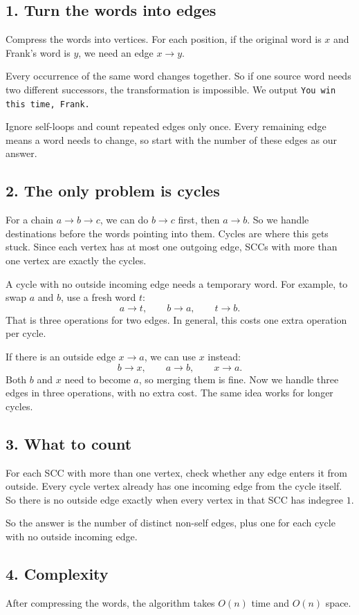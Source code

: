 \documentclass[11pt,a4paper]{article}
\begin{document}

\subsection*{1. Turn the words into edges}

Compress the words into vertices. For each position, if the original
word is $x$ and Frank's word is $y$, we need an edge $x\to y$.

Every occurrence of the same word changes together. So if one source
word needs two different successors, the transformation is impossible.
We output \texttt{You win this time, Frank.}

Ignore self-loops and count repeated edges only once. Every remaining
edge means a word needs to change, so start with the number of these
edges as our answer.

\subsection*{2. The only problem is cycles}

For a chain $a\to b\to c$, we can do $b\to c$ first, then $a\to b$.
So we handle destinations before the words pointing into them.
Cycles are where this gets stuck. Since each vertex has at most one
outgoing edge, SCCs with more than one vertex are exactly the cycles.

A cycle with no outside incoming edge needs a temporary word.
For example, to swap $a$ and $b$, use a fresh word $t$:
\[
  a\to t,\qquad b\to a,\qquad t\to b.
\]
That is three operations for two edges. In general, this costs one
extra operation per cycle.

If there is an outside edge $x\to a$, we can use $x$ instead:
\[
  b\to x,\qquad a\to b,\qquad x\to a.
\]
Both $b$ and $x$ need to become $a$, so merging them is fine.
Now we handle three edges in three operations, with no extra cost.
The same idea works for longer cycles.

\subsection*{3. What to count}

For each SCC with more than one vertex, check whether any edge enters
it from outside. Every cycle vertex already has one incoming edge
from the cycle itself. So there is no outside edge exactly when
every vertex in that SCC has indegree $1$.

So the answer is the number of distinct non-self edges, plus one for
each cycle with no outside incoming edge.

\subsection*{4. Complexity}

After compressing the words, the algorithm takes $O(n)$ time and
$O(n)$ space.
\end{document}
